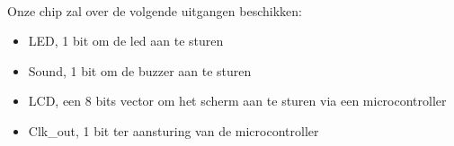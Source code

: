 \noindent
\\
Onze chip zal over de volgende uitgangen beschikken:
\begin{itemize}[nolistsep]
\item	LED, 1 bit om de led aan te sturen
\item	Sound, 1 bit om de buzzer aan te sturen
\item	LCD, een 8 bits vector om het scherm aan te sturen via een microcontroller
\item  Clk\_out, 1 bit ter aansturing van de microcontroller
\end{itemize}
